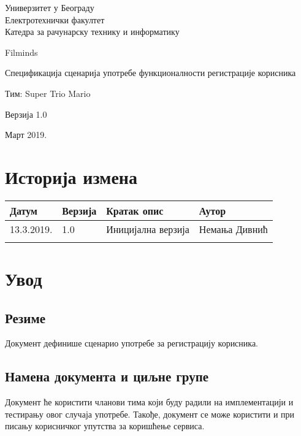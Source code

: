 \documentclass[12pt,a4paper]{article}
\begin{document}
\begin{titlepage}
\begin{center}
  Универзитет у Београду \\
  Електротехнички факултет \\
  Катедра за рачунарску технику и информатику \\
  \vfill

  {\fontsize{50}{60}\selectfont Filminds}
  \vskip 0.6cm

  {\large Спецификација сценарија употребе функционалности регистрације корисника  }
  \vskip 0.3cm
  
  {\large Тим: Super Trio Mario}
  \vskip 0.3cm

  {\large Верзија 1.0}

  \vfill
  \vfill

  Март 2019.
\hfill

\end{center}
\end{titlepage}

\section*{Историја измена}
\noindent
\setcellgapes{4pt}
\makegapedcells
\begin{tabularx}{\linewidth}{|l|l|X|X|}
    \hline
    \textbf{Датум} & \textbf{Верзија} & \textbf{Кратак опис} & \textbf{Аутор} \\
    \hline
    13.3.2019. & 1.0 & Иницијална верзија & Немања Дивнић \\
    \hline
    & & & \\
    \hline
\end{tabularx}
\newpage

\tableofcontents
\newpage

\section{Увод}
\subsection{Резиме}
Документ дефинише сценарио употребе за регистрацију корисника.
\subsection{Намена документа и циљне групе}
Документ ће користити чланови тима који буду радили на имплементацији и тестирању овог случаја употребе. Такође, документ се може користити и при писању корисничког упутства за коришћење сервиса.
\end{document}
